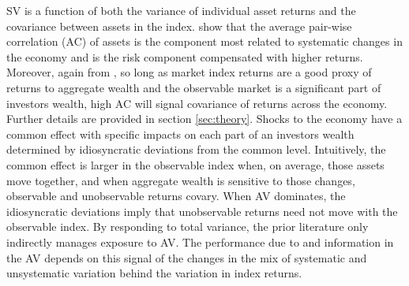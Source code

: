 SV is a function of both the variance of individual asset returns and the covariance between assets in the index. \citet{pollet_average_2010} show that the average pair-wise correlation (AC) of assets is the component most related to systematic changes in the economy and is the risk component compensated with higher returns. Moreover, again from \citet{pollet_average_2010}, so long as market index returns are a good proxy of returns to aggregate wealth and the observable market is a significant part of investors wealth, high AC will signal covariance of returns across the economy. Further details are provided in section \ref{sec:theory}. Shocks to the economy have a common effect with specific impacts on each part of an investors wealth determined by idiosyncratic deviations from the common level. Intuitively, the common effect is larger in the observable index when, on average, those assets move together, and when aggregate wealth is sensitive to those changes, observable and unobservable returns covary. When AV dominates, the idiosyncratic deviations imply that unobservable returns need not move with the observable index. By responding to total variance, the prior literature only indirectly manages exposure to AV. The performance due to and information in the AV depends on this signal of the changes in the mix of systematic and unsystematic variation behind the variation in index returns.
